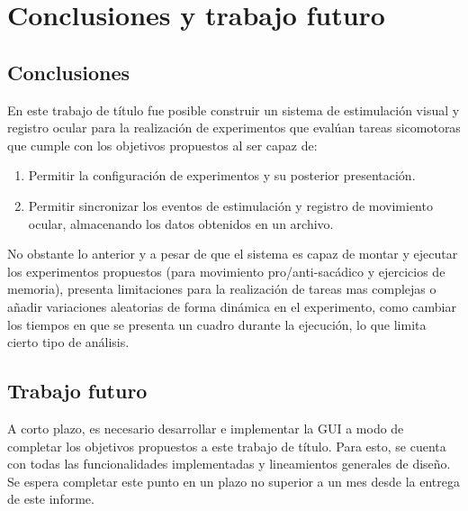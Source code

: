 \documentclass[\main/main.tex]{subfiles}
\begin{document}
\chapter{Conclusiones y trabajo futuro}
\label{cha:05_conclusiones_y_trabajo_futuro}
	\section{Conclusiones}
	\label{sec:05_conclusiones}
		En este trabajo de título fue posible construir un sistema de estimulación visual y registro ocular para la realización de experimentos que evalúan tareas sicomotoras que cumple con los objetivos propuestos al ser capaz de:
		\begin{enumerate}\setlength\itemsep{-0.2em}
			\item Permitir la configuración de experimentos y su posterior presentación.

			\item Permitir sincronizar los eventos de estimulación y registro de movimiento ocular, almacenando los datos obtenidos en un archivo.

		\end{enumerate} 

		No obstante lo anterior y a pesar de que el sistema es capaz de montar y ejecutar los experimentos propuestos (para movimiento pro/anti-sacádico y ejercicios de memoria), presenta limitaciones para la realización de tareas mas complejas o añadir variaciones aleatorias de forma dinámica en el experimento, como cambiar los tiempos en que se presenta un cuadro durante la ejecución, lo que limita cierto tipo de análisis. 
 		 

	\section{Trabajo futuro}
	\label{sec:05_trabajo_futuro}
		A corto plazo, es necesario desarrollar e implementar la GUI a modo de completar los objetivos propuestos a este trabajo de título. Para esto, se cuenta con todas las funcionalidades implementadas y lineamientos generales de diseño. Se espera completar este punto en un plazo no superior a un mes desde la entrega de este informe.  
\end{document}
